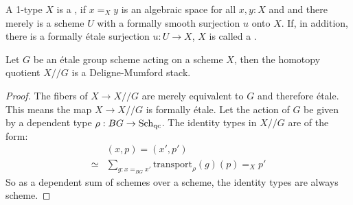 
\begin{definition}
  A 1-type $X$ is a ,
  if $x=_Xy$ is an algebraic space for all $x,y:X$ and
  and there merely is a scheme $U$ with a formally smooth surjection $u$ onto $X$.
  If, in addition, there is a
  formally étale surjection $u:U\to X$,
  $X$ is called a .
\end{definition}

\begin{proposition}
  Let $G$ be an étale group scheme acting on a scheme $X$,
  then the homotopy quotient $X//G$ is a Deligne-Mumford stack.
\end{proposition}

\begin{proof}
  The fibers of $X\to X//G$ are merely equivalent to $G$
  and therefore étale.
  This means the map $X\to X//G$ is formally étale.
  Let the action of $G$ be given by a dependent type
  $\rho:BG\to \operatorname{\mathrm{Sch}_{qc}}$.
  The identity types in $X//G$ are of the form:
  \begin{align*}
    &(x,p)=(x',p') \\
    \simeq& \sum_{g:x=_{BG}x'}\mathrm{transport}_{\rho}(g)(p)=_Xp'
  \end{align*}
  So as a dependent sum of schemes over a scheme,
  the identity types are always scheme. 
\end{proof}